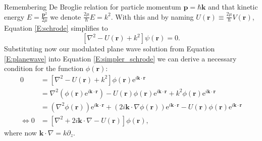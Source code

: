 \documentclass[a4paper, twoside, english, 12pt]{report}
\begin{document}
Remembering De Broglie relation for particle momentum $\mathbf{p}=\hbar\mathbf{k}$ and that kinetic energy $E=\frac{\mathbf{p}^2}{2\mu}$ we denote $\frac{2\mu}{\hbar}E=k^2$. With this and by naming $U(\mathbf{r})\equiv\frac{2\mu}{\hbar}V(\mathbf{r})$, Equation \eqref{E:schrode} simplifies to
\begin{equation}\label{E:simpler_schrode}
	\left[\nabla^2-U(\mathbf{r})+k^2\right]\psi(\mathbf{r}) = 0.
\end{equation}
Substituting now our modulated plane wave solution from Equation \eqref{E:planewave} into Equation \eqref{E:simpler_schrode} we can derive a necessary condition for the function $\phi(\mathbf{r})$:
\begin{align}\label{E:phi_schrode}
	0 &= \left[\nabla^2-U(\mathbf{r})+k^2\right]\phi(\mathbf{r})\mathrm{e}^{i \mathbf{k}\cdot\mathbf{r}} \nonumber\\
	&=\nabla^2\left(\phi(\mathbf{r})\mathrm{e}^{i \mathbf{k}\cdot\mathbf{r}}\right)-U(\mathbf{r})\phi(\mathbf{r})\mathrm{e}^{i \mathbf{k}\cdot\mathbf{r}}+k^2\phi(\mathbf{r})\mathrm{e}^{i \mathbf{k}\cdot\mathbf{r}} \nonumber\\
	&=\left(\nabla^2\phi(\mathbf{r})\right)\mathrm{e}^{i \mathbf{k}\cdot\mathbf{r}} + \left(2i\mathbf{k}\cdot\nabla\phi(\mathbf{r})\right)\mathrm{e}^{i \mathbf{k}\cdot\mathbf{r}}  -U(\mathbf{r})\phi(\mathbf{r})\mathrm{e}^{i \mathbf{k}\cdot\mathbf{r}} \nonumber\\
\iff 0 &= \left[\nabla^2 +2i\mathbf{k}\cdot\nabla -U(\mathbf{r})\right]\phi(\mathbf{r}),
\end{align}
where now $\mathbf{k}\cdot\nabla = k\partial_z$.
\end{document}
